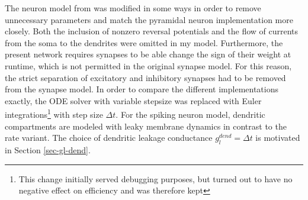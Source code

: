 The neuron model from \cite{Stapmanns2021} was modified in some ways in order to remove unnecessary parameters and match
the pyramidal neuron implementation more closely. Both the inclusion of nonzero reversal potentials and the flow of
currents from the soma to the dendrites were omitted in my model.  Furthermore, the present network
requires synapses to be able change the sign of their weight at runtime, which is not permitted in the original synapse
model. For this reason, the strict separation of excitatory and inhibitory synapses had to be removed from the synapse
model. In order to compare the different implementations exactly, the ODE solver with variable stepsize was replaced
with Euler integrations\footnote{This change initially served debugging purposes, but turned out to have no negative
effect on efficiency and was therefore kept} with step size $\Delta t$. For the spiking neuron model, dendritic
compartments are modeled with leaky membrane dynamics in contrast to the rate variant. The choice of dendritic leakage
conductance $g_l^{dend}=\Delta t$ is motivated in Section \ref{sec-gl-dend}. 

